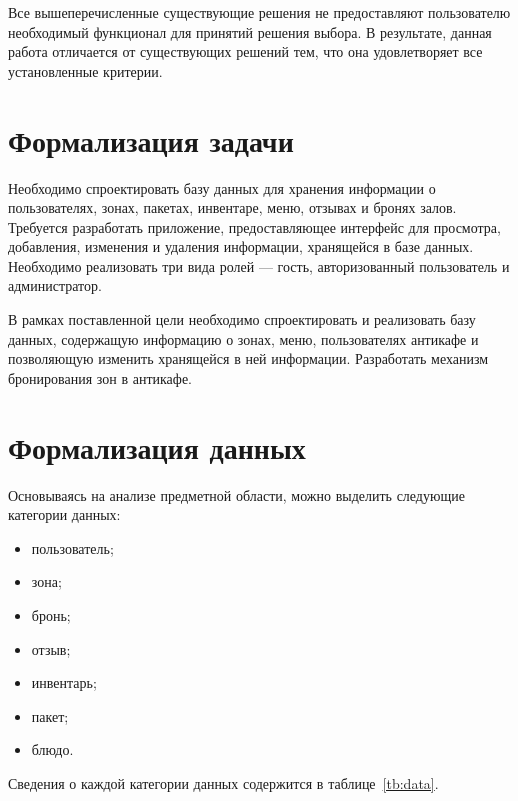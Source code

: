 Все вышеперечисленные существующие решения не предоставляют пользователю необходимый функционал для принятий решения выбора. В результате, данная работа отличается от существующих решений тем, что она удовлетворяет все установленные критерии.

\section{Формализация задачи}

Необходимо спроектировать базу данных для хранения информации о пользователях, зонах, пакетах, инвентаре, меню, отзывах и бронях залов. Требуется разработать приложение, предоставляющее интерфейс для просмотра, добавления, изменения и удаления информации, хранящейся в базе данных. Необходимо реализовать три вида ролей — гость, авторизованный пользователь и администратор.

В рамках поставленной цели необходимо спроектировать и реализовать базу данных, содержащую информацию о зонах, меню, пользователях антикафе и позволяющую изменить хранящейся в ней информации. Разработать механизм бронирования зон в антикафе.

\section{Формализация данных}
Основываясь на анализе предметной области, можно выделить следующие категории данных:
\begin{itemize}
	\item пользователь;
	\item зона;
	\item бронь;
	\item отзыв;
	\item инвентарь;
	\item пакет;
	\item блюдо.
\end{itemize}

Сведения о каждой категории данных содержится в таблице~\ref{tb:data}.


